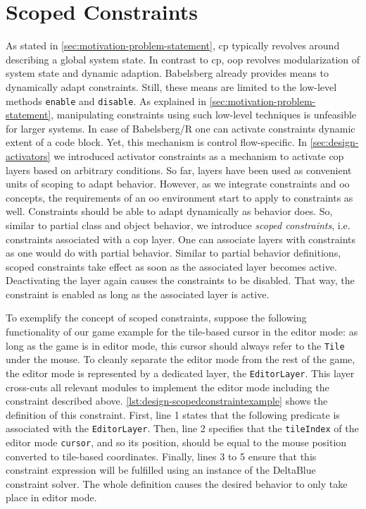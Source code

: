\section{Scoped Constraints}
\label{sec:design-scopedconstraints}
As stated in \autoref{sec:motivation-problem-statement}, \gls{cp} typically revolves around describing a global system state. In contrast to \gls{cp}, \gls{oop} revolves modularization of system state and dynamic adaption.
%
Babelsberg already provides means to dynamically adapt constraints. Still, these means are limited to the low-level methods \texttt{enable} and \texttt{disable}.
As explained in \autoref{sec:motivation-problem-statement}, manipulating constraints using such low-level techniques is unfeasible for larger systems.
In case of Babelsberg/R one can activate constraints dynamic extent of a code block. Yet, this mechanism is control flow-specific.
In \autoref{sec:design-activators} we introduced activator constraints as a mechanism to activate \gls{cop} layers based on arbitrary conditions. So far, layers have been used as convenient units of scoping to adapt behavior.
%
%
However, as we integrate constraints and \gls{oo} concepts, the requirements of an \gls{oo} environment start to apply to constraints as well. Constraints should be able to adapt dynamically as behavior does.
So, similar to partial class and object behavior, we introduce \emph{scoped constraints}, i.e. constraints associated with a \gls{cop} layer.
%
One can associate layers with constraints as one would do with partial behavior.
Similar to partial behavior definitions, scoped constraints take effect as soon as the associated layer becomes active.
Deactivating the layer again causes the constraints to be disabled.
That way, the constraint is enabled as long as the associated layer is active.

To exemplify the concept of scoped constraints, suppose the following functionality of our game example for the tile-based cursor in the editor mode: as long as the game is in editor mode, this cursor should always refer to the \texttt{Tile} under the mouse.
To cleanly separate the editor mode from the rest of the game, the editor mode is represented by a dedicated layer, the \texttt{EditorLayer}. This layer cross-cuts all relevant modules to implement the editor mode including the constraint described above. \autoref{lst:design-scopedconstraintexample} shows the definition of this constraint. First, line 1 states that the following predicate is associated with the \texttt{EditorLayer}. Then, line 2 specifies that the \texttt{tileIndex} of the editor mode \texttt{cursor}, and so its position, should be equal to the mouse position converted to tile-based coordinates. Finally, lines 3 to 5 ensure that this constraint expression will be fulfilled using an instance of the DeltaBlue constraint solver. The whole definition causes the desired behavior to only take place in editor mode.

